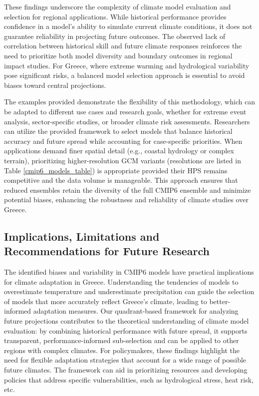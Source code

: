 \documentclass[pdflatex,sn-chicago]{sn-jnl}%
\theoremstyle{thmstyleone}%
\theoremstyle{thmstyletwo}%
\theoremstyle{thmstylethree}%
\begin{document}
These findings underscore the complexity of climate model evaluation and selection for regional applications. While historical performance provides confidence in a model’s ability to simulate current climate conditions, it does not guarantee reliability in projecting future outcomes. The observed lack of correlation between historical skill and future climate responses reinforces the need to prioritize both model diversity and boundary outcomes in regional impact studies. For Greece, where extreme warming and hydrological variability pose significant risks, a balanced model selection approach is essential to avoid biases toward central projections.

The examples provided demonstrate the flexibility of this methodology, which can be adapted to different use cases and research goals, whether for extreme event analysis, sector-specific studies, or broader climate risk assessments. Researchers can utilize the provided framework to select models that balance historical accuracy and future spread while accounting for case-specific priorities. When applications demand finer spatial detail (e.g., coastal hydrology or complex terrain), prioritizing higher-resolution GCM variants (resolutions are listed in Table \ref{cmip6_models_table}) is appropriate provided their HPS remains competitive and the data volume is manageable. This approach ensures that reduced ensembles retain the diversity of the full CMIP6 ensemble and minimize potential biases, enhancing the robustness and reliability of climate studies over Greece.


\subsection{Implications, Limitations and Recommendations for Future Research }
The identified biases and variability in CMIP6 models have practical implications for climate adaptation in Greece. Understanding the tendencies of models to overestimate temperature and underestimate precipitation can guide the selection of models that more accurately reflect Greece’s climate, leading to better-informed adaptation measures. Our quadrant-based framework for analyzing future projections contributes to the theoretical understanding of climate model evaluation: by combining historical performance with future spread, it supports transparent, performance-informed sub-selection and can be applied to other regions with complex climates. For policymakers, these findings highlight the need for flexible adaptation strategies that account for a wide range of possible future climates. The framework can aid in prioritizing resources and developing policies that address specific vulnerabilities, such as hydrological stress, heat risk, etc.
\end{document}
